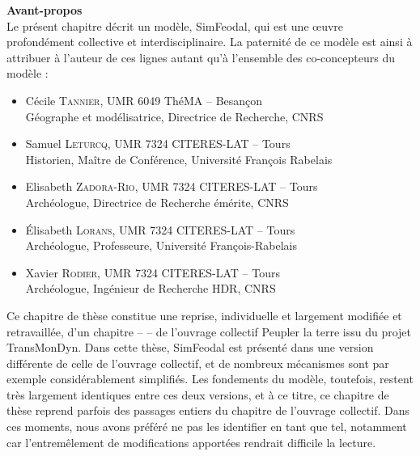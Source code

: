 \begin{mdframed}[backgroundcolor=gray!10,footnoteinside=false]
	\textbf{Avant-propos}\\
Le présent chapitre décrit un modèle, SimFeodal, qui est une œuvre profondément collective et interdisciplinaire.
La paternité de ce modèle est ainsi à attribuer à l'auteur de ces lignes autant qu'à l'ensemble des co-concepteurs du modèle :
\begin{itemize}
	\item Cécile \textsc{Tannier}, UMR 6049 ThéMA -- Besançon\\
	Géographe et modélisatrice, Directrice de Recherche, CNRS
	\item Samuel \textsc{Leturcq}, UMR 7324 CITERES-LAT -- Tours\\
	Historien, Maître de Conférence, Université François Rabelais
	\item Elisabeth \textsc{Zadora-Rio}, UMR 7324 CITERES-LAT -- Tours\\
	Archéologue, Directrice de Recherche émérite, CNRS
	\item Élisabeth \textsc{Lorans}, UMR 7324 CITERES-LAT -- Tours\\
	Archéologue, Professeure, Université François-Rabelais
	\item Xavier \textsc{Rodier}, UMR 7324 CITERES-LAT -- Tours\\
	Archéologue, Ingénieur de Recherche HDR, CNRS

\end{itemize}

Ce chapitre de thèse constitue une reprise, individuelle et largement modifiée et retravaillée, d'un chapitre --  \autocite{cura_transition_2017} -- de l'ouvrage collectif \og Peupler la terre\fg{} \autocite{sanders2018peupler} issu du projet TransMonDyn\footnotemark.
Dans cette thèse, SimFeodal est présenté dans une version différente de celle de l'ouvrage collectif, et de nombreux mécanismes sont par exemple considérablement simplifiés.
Les fondements du modèle, toutefois, restent très largement identiques entre ces deux versions, et à ce titre, ce chapitre de thèse reprend parfois des passages entiers du chapitre de l'ouvrage collectif.
Dans ces moments, nous avons préféré ne pas les identifier en tant que tel, notamment car l'entremêlement de modifications apportées rendrait difficile la lecture.


\end{mdframed}
